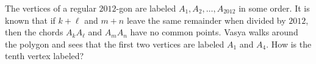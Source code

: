 The vertices of a regular $2012$-gon are labeled $A_1,A_2,\ldots, A_{2012}$ in some order. It is known that if $k+\ell$ and $m+n$ leave the same remainder when divided by $2012$,  then the chords $A_kA_{\ell}$ and $A_mA_n$ have no common points. Vasya walks around the polygon and sees that the first two vertices are labeled $A_1$ and $A_4$. How is the tenth vertex labeled?